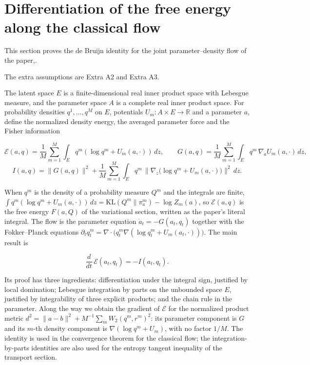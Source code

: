 \documentclass[11pt,a4paper]{report}
\begin{document}
\section{\texorpdfstring{Differentiation of the free energy along the classical flow}{Differentiation of the free energy along the classical flow}}


This section proves the de Bruijn identity for the joint parameter–density flow of the paper,.




The extra assumptions are Extra A2 and Extra A3.




The latent space \(E\) is a finite-dimensional real inner product space with Lebesgue measure, and the parameter space \(A\) is a complete real inner product space. For probability densities \(q^1,\dots,q^M\) on \(E\), potentials \(U_m:A\times E\to\mathbb R\) and a parameter \(a\), define the normalized density energy, the averaged parameter force and the Fisher information


\[\mathcal E(a,q)=\frac1M\sum_{m=1}^M\int_Eq^m(\log q^m+U_m(a,\cdot))\,dz,\qquad G(a,q)=\frac1M\sum_{m=1}^M\int_Eq^m\,\nabla_aU_m(a,\cdot)\,dz,\]
\[I(a,q)=\|G(a,q)\|^2+\frac1M\sum_{m=1}^M\int_Eq^m\,\bigl\|\nabla_z\bigl(\log q^m+U_m(a,\cdot)\bigr)\bigr\|^2\,dz.\]


When \(q^m\) is the density of a probability measure \(Q^m\) and the integrals are finite, \(\int q^m(\log q^m+U_m(a,\cdot))\,dz=\mathrm{KL}(Q^m\|\pi_a^m)-\log Z_m(a)\), so \(\mathcal E(a,q)\) is the free energy \(F(a,Q)\) of the variational section, written as the paper's literal integral. The flow is the parameter equation \(\dot a_t=-G(a_t,q_t)\) together with the Fokker–Planck equations \(\partial_tq_t^m=\nabla\cdot\bigl(q_t^m\nabla(\log q_t^m+U_m(a_t,\cdot))\bigr)\). The main result is


\[\frac{d}{dt}\,\mathcal E(a_t,q_t)=-I(a_t,q_t).\]


Its proof has three ingredients: differentiation under the integral sign, justified by local domination; Lebesgue integration by parts on the unbounded space \(E\), justified by integrability of three explicit products; and the chain rule in the parameter. Along the way we obtain the gradient of \(\mathcal E\) for the normalized product metric \(d^2=\|a-b\|^2+M^{-1}\sum_mW_2(q^m,r^m)^2\): its parameter component is \(G\) and its \(m\)-th density component is \(\nabla(\log q^m+U_m)\), with no factor \(1/M\). The identity is used in the convergence theorem for the classical flow; the integration-by-parts identities are also used for the entropy tangent inequality of the transport section.
\end{document}
